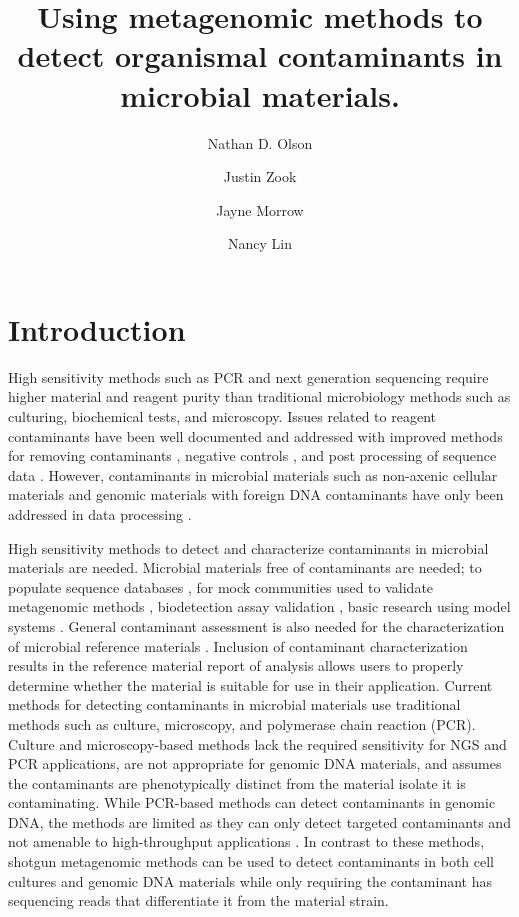 \documentclass[fleqn,10pt,lineno]{wlpeerj}\usepackage[]{graphicx}\usepackage[]{color}
\title{Using metagenomic methods to detect organismal contaminants in microbial materials.}
\author[1]{Nathan D. Olson}
\author[1]{Justin Zook}
\author[1]{Jayne Morrow}
\author[1]{Nancy Lin}
\affil[1]{Material Measurement Laboratory, National Institute of Standards and Technology}
\begin{document}
\flushbottom
\maketitle
\thispagestyle{empty}

\section*{Introduction}
High sensitivity methods such as PCR and next generation sequencing require higher material and reagent purity than traditional microbiology methods such as culturing, biochemical tests, and microscopy. 
Issues related to reagent contaminants have been well documented and addressed with improved methods for removing contaminants \citep{woyke2011decontamination,motley2014improved}, negative controls \citep{jervis2015deriving}, and post processing of sequence data \citep{mukherjee2015large}. 
However, contaminants in microbial materials such as non-axenic cellular materials and genomic materials with foreign DNA contaminants have only been addressed in data processing \citep{Shrestha2013,tennessen2015prodege}. 

High sensitivity methods to detect and characterize contaminants in microbial materials are needed.  
Microbial materials free of contaminants are needed; to populate sequence databases \citep{parks2015checkm}, for mock communities used to validate metagenomic methods \citep{bokulich2016mockrobiota}, biodetection assay validation \citep{Ieven2013,International2011}, basic research using model systems \citep{Shrestha2013}. 
General contaminant assessment is also needed for the characterization of microbial reference materials \citep{olson2016pepr}. 
Inclusion of contaminant characterization results in the reference material report of analysis allows users to properly determine whether the material is suitable for use in their application. 
Current methods for detecting contaminants in microbial materials use traditional methods such as culture, microscopy, and polymerase chain reaction (PCR). 
Culture and microscopy-based methods lack the required sensitivity for NGS and PCR applications, are not appropriate for genomic DNA materials, and assumes the contaminants are phenotypically distinct from the material isolate it is contaminating. 
While PCR-based methods can detect contaminants in genomic DNA, the methods are limited as they can only detect targeted contaminants and not amenable to high-throughput applications \citep{heck2016evaluating,Marron2013}. 
In contrast to these methods, shotgun metagenomic methods can be used to detect contaminants in both cell cultures and genomic DNA materials while only requiring the contaminant has sequencing reads that differentiate it from the material strain. 
\end{document}
